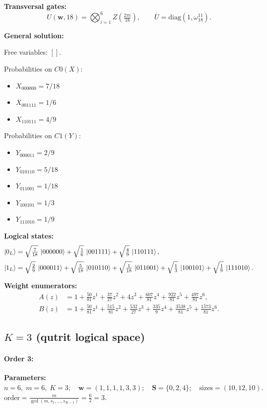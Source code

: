 \documentclass[11pt]{article}
\begin{document}
\noindent\textbf{Transversal gates:}
\[
    U(\mathbf w,18)=\bigotimes_{i=1}^{6} Z \left(\tfrac{2\pi i}{18}\right),\qquad
    \overline U=\mathrm{diag}(1,\omega_{18}^{11}).
\]

\noindent\textbf{General solution:}

Free variables: $[]$.

Probabilities on $C0 (X)$:
\begin{itemize}
    \item $X_{000000} = 7/18$
    \item $X_{001111} = 1/6$
    \item $X_{110111} = 4/9$
\end{itemize}

Probabilities on $C1 (Y)$:
\begin{itemize}
    \item $Y_{000011} = 2/9$
    \item $Y_{010110} = 5/18$
    \item $Y_{011001} = 1/18$
    \item $Y_{100101} = 1/3$
    \item $Y_{111010} = 1/9$
\end{itemize}

\noindent\textbf{Logical states:}
\begin{align*}
\ket{0_L} &= \sqrt{\tfrac{7}{18}}\,\ket{000000} + \sqrt{\tfrac{1}{6}}\,\ket{001111} + \sqrt{\tfrac{4}{9}}\,\ket{110111},
\\[2pt]
\ket{1_L} &= \sqrt{\tfrac{2}{9}}\,\ket{000011} + \sqrt{\tfrac{5}{18}}\,\ket{010110} + \sqrt{\tfrac{1}{18}}\,\ket{011001} + \sqrt{\tfrac{1}{3}}\,\ket{100101} + \sqrt{\tfrac{1}{9}}\,\ket{111010}.
\end{align*}

\noindent\textbf{Weight enumerators:}
\begin{align*}
A(z) &= 1 + \tfrac{50}{81}z^{1} + \tfrac{37}{27}z^{2} + 4z^{3} + \tfrac{607}{81}z^{4} + \tfrac{922}{81}z^{5} + \tfrac{497}{81}z^{6},\\[2pt]
B(z) &= 1 + \tfrac{50}{81}z^{1} + \tfrac{515}{81}z^{2} + \tfrac{532}{27}z^{3} + \tfrac{335}{9}z^{4} + \tfrac{3538}{81}z^{5} + \tfrac{1573}{81}z^{6}.
\end{align*}

\subsection{$K=3$ (qutrit logical space)}

\paragraph{\textbf{Order 3:}}
\noindent\textbf{Parameters:} $n=6,\; m=6,\; K=3;\quad \mathbf w=(1, 1, 1, 1, 3, 3);\quad \mathbf S=\{0, 2, 4\};\quad \text{sizes}=\left(10, 12, 10\right).$ $\displaystyle \text{order}=\frac{m}{\gcd(m,s_1,\dots,s_{K-1})}=\frac{6}{2}=3.$
\end{document}
